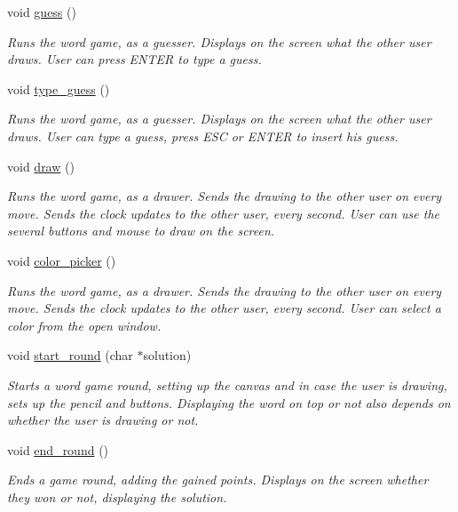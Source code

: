 \begin{DoxyCompactItemize}
void \mbox{\hyperlink{group__pengoo_ga089d0f37444b1b486cf98045a512deed}{guess}} ()
\begin{DoxyCompactList}\small\item\em Runs the word game, as a guesser. Displays on the screen what the other user draws. User can press E\+N\+T\+ER to type a guess. \end{DoxyCompactList}\item 
void \mbox{\hyperlink{group__pengoo_gabe23d2dac0552bf9069a47573770d379}{type\+\_\+guess}} ()
\begin{DoxyCompactList}\small\item\em Runs the word game, as a guesser. Displays on the screen what the other user draws. User can type a guess, press E\+SC or E\+N\+T\+ER to insert his guess. \end{DoxyCompactList}\item 
void \mbox{\hyperlink{group__pengoo_ga56c5cf8a568cff737ff95520cbe6b405}{draw}} ()
\begin{DoxyCompactList}\small\item\em Runs the word game, as a drawer. Sends the drawing to the other user on every move. Sends the clock updates to the other user, every second. User can use the several buttons and mouse to draw on the screen. \end{DoxyCompactList}\item 
void \mbox{\hyperlink{group__pengoo_ga178ee685108a5f6164bf1c1757040ee2}{color\+\_\+picker}} ()
\begin{DoxyCompactList}\small\item\em Runs the word game, as a drawer. Sends the drawing to the other user on every move. Sends the clock updates to the other user, every second. User can select a color from the open window. \end{DoxyCompactList}\item 
void \mbox{\hyperlink{group__pengoo_ga02cb99bd23a1083281e874b3b4ebbad5}{start\+\_\+round}} (char $\ast$solution)
\begin{DoxyCompactList}\small\item\em Starts a word game round, setting up the canvas and in case the user is drawing, sets up the pencil and buttons. Displaying the word on top or not also depends on whether the user is drawing or not. \end{DoxyCompactList}\item 
void \mbox{\hyperlink{group__pengoo_gaf06af764d8b387c19edc38c0effd1115}{end\+\_\+round}} ()
\begin{DoxyCompactList}\small\item\em Ends a game round, adding the gained points. Displays on the screen whether they won or not, displaying the solution. \end{DoxyCompactList}\item 

\end{DoxyCompactItemize}
